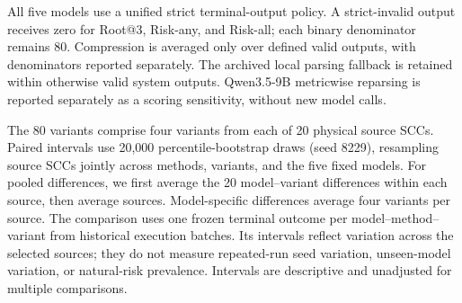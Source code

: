 All five models use a unified strict terminal-output policy. A strict-invalid output receives zero for Root@3, Risk-any, and Risk-all; each binary denominator remains 80. Compression is averaged only over defined valid outputs, with denominators reported separately. The archived local parsing fallback is retained within otherwise valid system outputs. Qwen3.5-9B metricwise reparsing is reported separately as a scoring sensitivity, without new model calls.

The 80 variants comprise four variants from each of 20 physical source SCCs. Paired intervals use 20,000 percentile-bootstrap draws (seed 8229), resampling source SCCs jointly across methods, variants, and the five fixed models. For pooled differences, we first average the 20 model--variant differences within each source, then average sources. Model-specific differences average four variants per source. The comparison uses one frozen terminal outcome per model--method--variant from historical execution batches. Its intervals reflect variation across the selected sources; they do not measure repeated-run seed variation, unseen-model variation, or natural-risk prevalence. Intervals are descriptive and unadjusted for multiple comparisons.

